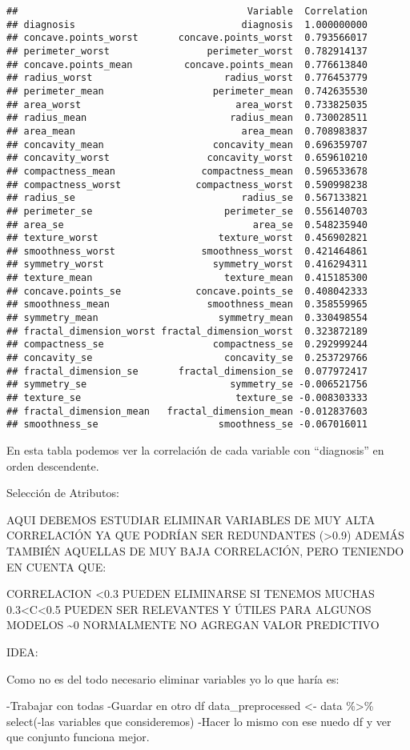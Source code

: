 \documentclass[
]{article}
\begin{document}
\begin{verbatim}
##                                        Variable  Correlation
## diagnosis                             diagnosis  1.000000000
## concave.points_worst       concave.points_worst  0.793566017
## perimeter_worst                 perimeter_worst  0.782914137
## concave.points_mean         concave.points_mean  0.776613840
## radius_worst                       radius_worst  0.776453779
## perimeter_mean                   perimeter_mean  0.742635530
## area_worst                           area_worst  0.733825035
## radius_mean                         radius_mean  0.730028511
## area_mean                             area_mean  0.708983837
## concavity_mean                   concavity_mean  0.696359707
## concavity_worst                 concavity_worst  0.659610210
## compactness_mean               compactness_mean  0.596533678
## compactness_worst             compactness_worst  0.590998238
## radius_se                             radius_se  0.567133821
## perimeter_se                       perimeter_se  0.556140703
## area_se                                 area_se  0.548235940
## texture_worst                     texture_worst  0.456902821
## smoothness_worst               smoothness_worst  0.421464861
## symmetry_worst                   symmetry_worst  0.416294311
## texture_mean                       texture_mean  0.415185300
## concave.points_se             concave.points_se  0.408042333
## smoothness_mean                 smoothness_mean  0.358559965
## symmetry_mean                     symmetry_mean  0.330498554
## fractal_dimension_worst fractal_dimension_worst  0.323872189
## compactness_se                   compactness_se  0.292999244
## concavity_se                       concavity_se  0.253729766
## fractal_dimension_se       fractal_dimension_se  0.077972417
## symmetry_se                         symmetry_se -0.006521756
## texture_se                           texture_se -0.008303333
## fractal_dimension_mean   fractal_dimension_mean -0.012837603
## smoothness_se                     smoothness_se -0.067016011
\end{verbatim}

En esta tabla podemos ver la correlación de cada variable con
``diagnosis'' en orden descendente.

Selección de Atributos:

AQUI DEBEMOS ESTUDIAR ELIMINAR VARIABLES DE MUY ALTA CORRELACIÓN YA QUE
PODRÍAN SER REDUNDANTES (\textgreater0.9) ADEMÁS TAMBIÉN AQUELLAS DE MUY
BAJA CORRELACIÓN, PERO TENIENDO EN CUENTA QUE:

CORRELACION \textless0.3 PUEDEN ELIMINARSE SI TENEMOS MUCHAS
0.3\textless C\textless0.5 PUEDEN SER RELEVANTES Y ÚTILES PARA ALGUNOS
MODELOS \textasciitilde0 NORMALMENTE NO AGREGAN VALOR PREDICTIVO

IDEA:

Como no es del todo necesario eliminar variables yo lo que haría es:

-Trabajar con todas -Guardar en otro df data\_preprocessed \textless-
data \%\textgreater\% select(-las variables que consideremos) -Hacer lo
mismo con ese nuedo df y ver que conjunto funciona mejor.
\end{document}
